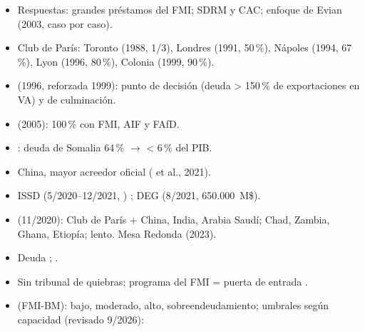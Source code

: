 \documentclass{article}
\begin{document}
\begin{columnas}
\begin{itemize}
  \begin{itemize}
  \item México 1994 (\emph{tesobonos}); Asia 1997 (corto plazo en dólares); Rusia 1998 y Brasil 1999; Argentina 2001 (canjes 2005 y 2010, \emph{holdouts}).
  \end{itemize}
\item Respuestas: grandes préstamos del FMI; SDRM y CAC; enfoque de Evian (2003, caso por caso).
\end{itemize}
\begin{itemize}
\item Club de París: Toronto (1988, 1/3), Londres (1991, 50\,\%), Nápoles (1994, 67\,\%), Lyon (1996, 80\,\%), Colonia (1999, 90\,\%).
\item {} (1996, reforzada 1999): punto de decisión (deuda > 150\,\% de exportaciones en VA) y de culminación.
\item {} (2005): 100\,\% con FMI, AIF y FAfD.
\item {}: deuda de Somalia 64\,\% $\to$ < 6\,\% del PIB.
\end{itemize}
\begin{itemize}
\item China, mayor acreedor oficial ( et al., 2021).
\item ISSD (5/2020–12/2021, ) ; DEG (8/2021, 650.000~M\$).
\item {} (11/2020): Club de París + China, India, Arabia Saudí; Chad, Zambia, Ghana, Etiopía; lento. Mesa Redonda (2023).
\item Deuda ; .
\end{itemize}
\begin{itemize}
\item Sin tribunal de quiebras; programa del FMI = puerta de entrada .
\end{itemize}
\noindent\begin{minipage}{\linewidth}
\begin{itemize}
\item {} (FMI-BM): bajo, moderado, alto, sobreendeudamiento; umbrales según capacidad (revisado 9/2026):

\end{itemize}
\end{minipage}
\end{columnas}
\end{document}
